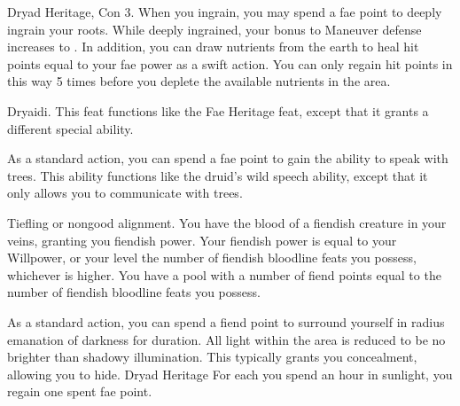     \featpres Dryad Heritage, Con 3.
    \featben When you ingrain, you may spend a fae point to deeply ingrain your roots. While deeply ingrained, your bonus to Maneuver defense increases to . In addition, you can draw nutrients from the earth to heal hit points equal to your fae power as a swift action. You can only regain hit points in this way 5 times before you deplete the available nutrients in the area.

    \featpre Dryaidi.
    \featben This feat functions like the Fae Heritage feat, except that it grants a different special ability.

    As a standard action, you can spend a fae point to gain the ability to speak with trees. This ability functions like the druid's wild speech ability, except that it only allows you to communicate with trees.

    \featpre Tiefling or nongood alignment.
    \featben You have the blood of a fiendish creature in your veins, granting you fiendish power.
    Your fiendish power is equal to your Willpower, or your level \add the number of fiendish bloodline feats you possess, whichever is higher.
    You have a pool with a number of fiend points equal to the number of fiendish bloodline feats you possess.

    As a standard action, you can spend a fiend point to surround yourself in \areamed radius emanation of darkness for \durshort duration.
    All light within the area is reduced to be no brighter than shadowy illumination.
    This typically grants you concealment, allowing you to hide.
    \featpre Dryad Heritage
    \featben For each you spend an hour in sunlight, you regain one spent fae point.
